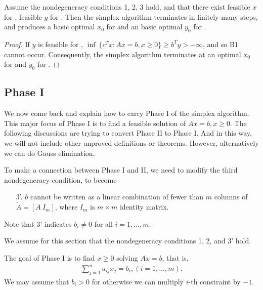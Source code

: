 \begin{theorem}
Assume the nondegeneracy conditions 1, 2, 3 hold, and that there exist feasible $x$ for , feasible $y$ for .
Then the simplex algorithm terminates in finitely many steps, and produces a basic optimal $x_0$ for  and an basic optimal $y_0$ for .
\end{theorem}

\begin{proof}
If $y$ is feasible for , $\inf \ \{ c^T x : Ax = b, x \ge 0 \} \ge b^T y > -\infty$,
and so B1 cannot occur.
Consequently, the simplex algorithm terminates at an optimal $x_0$ for  and $y_0$ for .
\end{proof}

\subsection{Phase I}

We now come back and explain how to carry Phase I of the simplex algorithm.
This major focus of Phase I is to find a feasible solution of $Ax = b, x \ge 0$.
The following discussions are trying to convert Phase II to Phase I.
And in this way, we will not include other unproved definitions or theorems.
However, alternatively we can do Gauss elimination.

\begin{remark}
To make a connection between Phase I and II, we need to modify the third nondegeneracy
condition, to become 
\begin{enumerate}
    \item[3'.] $b$ cannot be written as a linear combination of fewer than $m$ columns of $\tilde{A} = [A \ I_m]$, where $I_m$ is $m \times m$ identity matrix.
\end{enumerate}
Note that 3' indicates $b_i \neq 0$ for all $i = 1, \dots, m$.
\end{remark}

We assume for this section that the nondegeneracy conditions 1, 2, and 3' hold.

The goal of Phase I is to find $x \ge 0$ solving $Ax = b$, that is,
\begin{align}
\sum_{j = 1}^{n} a_{ij} x_j = b_i, (i = 1, \dots, m).
\end{align}
We may assume that $b_i > 0$ for otherwise we can multiply $i$-th constraint by $-1$.

